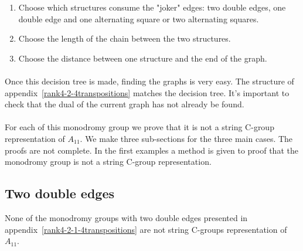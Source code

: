 \begin{enumerate}
  \item Choose which structures consume the "joker" edges: two double edges, one double edge and one alternating square or two alternating squares.
  \item Choose the length of the chain between the two structures.
  \item Choose the distance between one structure and the end of the graph.
\end{enumerate}

\paragraph{}
Once this decision tree is made, finding the graphs is very easy. The structure of appendix~\ref{rank4-2-4transpositions} matches the decision tree. It's important to check that the dual of the current graph has not already be found.

\paragraph{}
For each of this monodromy group we prove that it is not a string C-group representation of $A_{11}$. We make three sub-sections for the three main cases. The proofs are not complete. In the first examples a method is given to proof that the monodromy group is not a string C-group representation.

\subsection{Two double edges}

\begin{theorem}
  None of the monodromy groups with two double edges presented in appendix~\ref{rank4-2-1-4transpositions} are not string C-groups representation of $A_{11}$.
\end{theorem}

